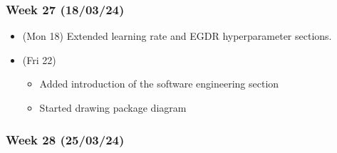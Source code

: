 \hypertarget{week-27-180324}{%
\subsubsection{Week 27 (18/03/24)}\label{week-27-180324}}

\begin{itemize}
\tightlist
\item
  (Mon 18) Extended learning rate and EGDR hyperparameter sections.
\item
  (Fri 22)

  \begin{itemize}
  \tightlist
  \item
    Added introduction of the software engineering section
  \item
    Started drawing package diagram
  \end{itemize}
\end{itemize}

\hypertarget{week-28-250324}{%
\subsubsection{Week 28 (25/03/24)}\label{week-28-250324}}

